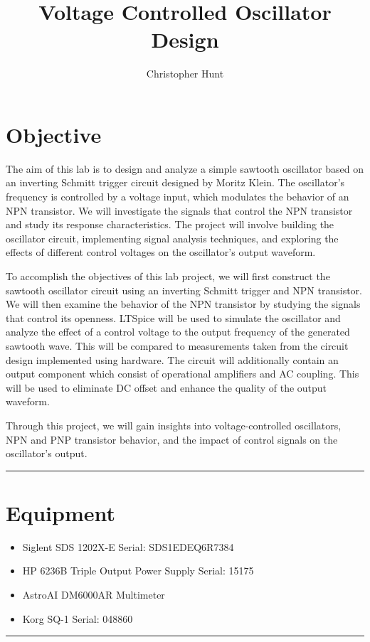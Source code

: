 \documentclass{article}
\title{\textbf{{\huge Voltage Controlled Oscillator Design}}}
\author{Christopher Hunt}
\date{}
\begin{document}
\pagestyle{fancy}
\fancyhf{}
\rhead{\thepage}
\maketitle
\section*{\textcolor{mycolor}{Objective}}
The aim of this lab is to design and analyze a simple sawtooth oscillator based on an inverting Schmitt trigger circuit designed by Moritz Klein. The oscillator's frequency is controlled by a voltage input, which modulates the behavior of an NPN transistor. We will investigate the signals that control the NPN transistor and study its response characteristics. The project will involve building the oscillator circuit, implementing signal analysis techniques, and exploring the effects of different control voltages on the oscillator's output waveform.

To accomplish the objectives of this lab project, we will first construct the sawtooth oscillator circuit using an inverting Schmitt trigger and NPN transistor. We will then examine the behavior of the NPN transistor by studying the signals that control its openness. LTSpice will be used to simulate the oscillator and analyze the effect of a control voltage to the output frequency of the generated sawtooth wave. This will be compared to measurements taken from the circuit design implemented using hardware. The circuit will additionally contain an output component which consist of operational amplifiers and AC coupling. This will be used to eliminate DC offset and enhance the quality of the output waveform.

Through this project, we will gain insights into voltage-controlled oscillators, NPN and PNP transistor behavior, and the impact of control signals on the oscillator's output.
\vspace{5mm}
\hrule

\section*{\textcolor{mycolor}{Equipment}}
\begin{itemize}
  \item Siglent SDS 1202X-E Serial: SDS1EDEQ6R7384
  \item HP 6236B Triple Output Power Supply Serial: 15175
  \item AstroAI DM6000AR Multimeter
  \item Korg SQ-1 Serial: 048860
\end{itemize}
\vspace{5mm}
\hrule
\end{document}

